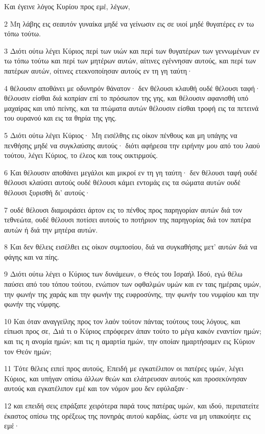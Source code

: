 \par Και έγεινε λόγος Κυρίου προς εμέ, λέγων,
\par 2 Μη λάβης εις σεαυτόν γυναίκα μηδέ να γείνωσιν εις σε υιοί μηδέ θυγατέρες εν τω τόπω τούτω.
\par 3 Διότι ούτω λέγει Κύριος περί των υιών και περί των θυγατέρων των γεννωμένων εν τω τόπω τούτω και περί των μητέρων αυτών, αίτινες εγέννησαν αυτούς, και περί των πατέρων αυτών, οίτινες ετεκνοποίησαν αυτούς εν τη γη ταύτη·
\par 4 θέλουσιν αποθάνει με οδυνηρόν θάνατον· δεν θέλουσι κλαυθή ουδέ θέλουσι ταφή· θέλουσιν είσθαι διά κοπρίαν επί το πρόσωπον της γης, και θέλουσιν αφανισθή υπό μαχαίρας και υπό πείνης, και τα πτώματα αυτών θέλουσιν είσθαι τροφή εις τα πετεινά του ουρανού και εις τα θηρία της γης.
\par 5 Διότι ούτω λέγει Κύριος· Μη εισέλθης εις οίκον πένθους και μη υπάγης να πενθήσης μηδέ να συγκλαύσης αυτούς· διότι αφήρεσα την ειρήνην μου από του λαού τούτου, λέγει Κύριος, το έλεος και τους οικτιρμούς.
\par 6 Και θέλουσιν αποθάνει μεγάλοι και μικροί εν τη γη ταύτη· δεν θέλουσι ταφή ουδέ θέλουσι κλαύσει αυτούς ουδέ θέλουσι κάμει εντομάς εις τα σώματα αυτών ουδέ θέλουσι ξυρισθή δι' αυτούς·
\par 7 ουδέ θέλουσι διαμοιράσει άρτον εις το πένθος προς παρηγορίαν αυτών διά τον τεθνεώτα, ουδέ θέλουσι ποτίσει αυτούς το ποτήριον της παρηγορίας διά τον πατέρα αυτών ή διά την μητέρα αυτών.
\par 8 Και δεν θέλεις εισέλθει εις οίκον συμποσίου, διά να συγκαθήσης μετ' αυτών διά να φάγης και να πίης.
\par 9 Διότι ούτω λέγει ο Κύριος των δυνάμεων, ο Θεός του Ισραήλ Ιδού, εγώ θέλω παύσει από του τόπου τούτου, ενώπιον των οφθαλμών υμών και εν ταις ημέραις υμών, την φωνήν της χαράς και την φωνήν της ευφροσύνης, την φωνήν του νυμφίου και την φωνήν της νύμφης.
\par 10 Και όταν αναγγείλης προς τον λαόν τούτον πάντας τούτους τους λόγους, και είπωσι προς σε, Διά τι ο Κύριος επρόφερεν άπαν τούτο το μέγα κακόν εναντίον ημών; και τις η ανομία ημών; και τις η αμαρτία ημών, την οποίαν ημαρτήσαμεν εις Κύριον τον Θεόν ημών;
\par 11 Τότε θέλεις ειπεί προς αυτούς, Επειδή με εγκατέλιπον οι πατέρες υμών, λέγει Κύριος, και υπήγαν οπίσω άλλων θεών και ελάτρευσαν αυτούς και προσεκύνησαν αυτούς και εγκατέλιπον εμέ και τον νόμον μου δεν εφύλαξαν·
\par 12 και επειδή σεις επράξατε χειρότερα παρά τους πατέρας υμών, και ιδού, περιπατείτε έκαστος οπίσω της ορέξεως της πονηράς αυτού καρδίας, ώστε να μη υπακούητε εις εμέ·
